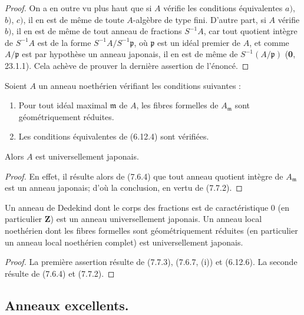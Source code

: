 \begin{proof}
On a en outre vu plus haut que si $A$ vérifie les conditions équivalentes
$a)$, $b)$, $c)$, il en est de même de toute $A$-algèbre de type fini. D'autre
part, si $A$ vérifie $b)$, il en est de même de tout anneau de fractions
$S^{-1}A$, car tout quotient intègre de $S^{-1}A$ est de la forme
$S^{-1}A/S^{-1}\mathfrak p$, où $\mathfrak p$ est un idéal premier de $A$, et
comme $A/\mathfrak p$ est par hypothèse un anneau japonais, il en est de même
de $S^{-1}(A/\mathfrak p)$ (\textbf{0}, 23.1.1). Cela achève de prouver la dernière
assertion de l'énoncé.
\end{proof}

\begin{corollary}[7.7.3]
\label{IV.2.s7.7.3-fr}
Soient $A$ un anneau noethérien vérifiant les conditions suivantes :
\begin{enumerate}
\item[\emph{(i)}] Pour tout idéal maximal $\mathfrak m$ de $A$, les fibres
formelles de $A_{\mathfrak m}$ sont géométriquement réduites.
\item[\emph{(ii)}] Les conditions équivalentes de \textup{(6.12.4)} sont vérifiées.
\end{enumerate}

Alors $A$ est universellement japonais.
\end{corollary}

\begin{proof}
En effet, il résulte alors de (7.6.4) que tout anneau quotient intègre de
$A_{\mathfrak m}$ est un anneau japonais; d'où la conclusion, en vertu de
(7.7.2).
\end{proof}

\begin{corollary}[7.7.4]
\label{IV.2.s7.7.4-fr}
Un anneau de Dedekind dont le corps des fractions est de caractéristique 0 (en
particulier $\mathbf Z$) est un anneau universellement japonais. Un anneau
local noethérien dont les fibres formelles sont géométriquement réduites (en
particulier un anneau local noethérien complet) est universellement japonais.
\end{corollary}

\begin{proof}
La première assertion résulte de (7.7.3), (7.6.7, (i)) et (6.12.6). La seconde
résulte de (7.6.4) et (7.7.2).
\end{proof}

\subsection{Anneaux excellents.}
\label{IV.2.ss7.8-fr}

